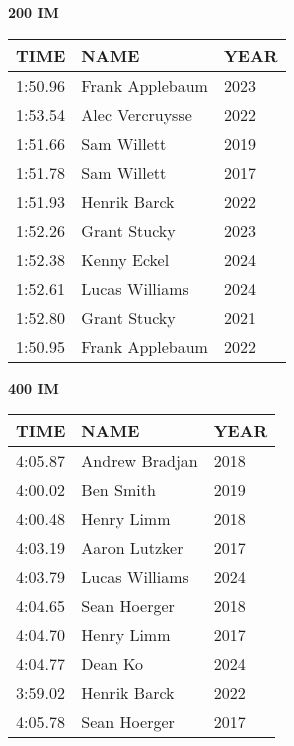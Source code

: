 \begin{minipage}[t]{0.48\textwidth}
\centering
\textbf{200 IM}\\[0.05cm]
\begin{tabular}{@{}p{1.8cm}p{2.8cm}p{1.2cm}@{}}
\hline
\textbf{TIME} & \textbf{NAME} & \textbf{YEAR} \\
\hline
1:50.96 & Frank Applebaum & 2023 \\
1:53.54 & Alec Vercruysse & 2022 \\
1:51.66 & Sam Willett & 2019 \\
1:51.78 & Sam Willett & 2017 \\
1:51.93 & Henrik Barck & 2022 \\
1:52.26 & Grant Stucky & 2023 \\
1:52.38 & Kenny Eckel & 2024 \\
1:52.61 & Lucas Williams & 2024 \\
1:52.80 & Grant Stucky & 2021 \\
1:50.95 & Frank Applebaum & 2022 \\
\hline
\end{tabular}
\end{minipage}\hfill
\begin{minipage}[t]{0.48\textwidth}
\centering
\textbf{400 IM}\\[0.05cm]
\begin{tabular}{@{}p{1.8cm}p{2.8cm}p{1.2cm}@{}}
\hline
\textbf{TIME} & \textbf{NAME} & \textbf{YEAR} \\
\hline
4:05.87 & Andrew Bradjan & 2018 \\
4:00.02 & Ben Smith & 2019 \\
4:00.48 & Henry Limm & 2018 \\
4:03.19 & Aaron Lutzker & 2017 \\
4:03.79 & Lucas Williams & 2024 \\
4:04.65 & Sean Hoerger & 2018 \\
4:04.70 & Henry Limm & 2017 \\
4:04.77 & Dean Ko & 2024 \\
3:59.02 & Henrik Barck & 2022 \\
4:05.78 & Sean Hoerger & 2017 \\
\hline
\end{tabular}
\end{minipage}

\vspace{0.4cm}

